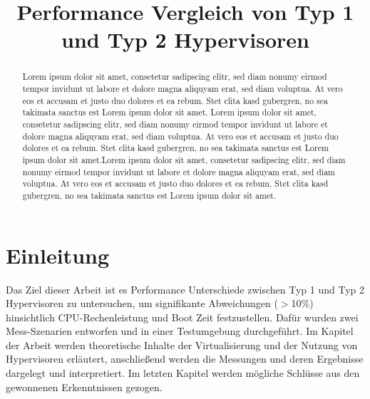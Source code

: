 \documentclass[conference]{IEEEtran}
\begin{document}
\title{Performance Vergleich von Typ 1 und Typ 2 Hypervisoren }

\author
{
}

\maketitle

\begin{abstract}
Lorem ipsum dolor sit amet, consetetur sadipscing elitr, sed diam nonumy eirmod tempor invidunt ut labore et dolore magna aliquyam erat, sed diam voluptua. At vero eos et accusam et justo duo dolores et ea rebum. Stet clita kasd gubergren, no sea takimata sanctus est Lorem ipsum dolor sit amet. Lorem ipsum dolor sit amet, consetetur sadipscing elitr, sed diam nonumy eirmod tempor invidunt ut labore et dolore magna aliquyam erat, sed diam voluptua. At vero eos et accusam et justo duo dolores et ea rebum. Stet clita kasd gubergren, no sea takimata sanctus est Lorem ipsum dolor sit amet.Lorem ipsum dolor sit amet, consetetur sadipscing elitr, sed diam nonumy eirmod tempor invidunt ut labore et dolore magna aliquyam erat, sed diam voluptua. At vero eos et accusam et justo duo dolores et ea rebum. Stet clita kasd gubergren, no sea takimata sanctus est Lorem ipsum dolor sit amet.
\end{abstract}

\IEEEpeerreviewmaketitle

\section{Einleitung}
\label{Einleitung}

Das Ziel dieser Arbeit ist es Performance Unterschiede zwischen Typ 1 und Typ 2 Hypervisoren zu untersuchen, um signifikante Abweichungen ($>$10\%) hinsichtlich CPU-Rechenleistung und Boot Zeit festzustellen. Dafür wurden zwei Mess-Szenarien entworfen und in einer Testumgebung durchgeführt. Im Kapitel der Arbeit werden theoretische Inhalte der Virtualisierung und der Nutzung von Hypervisoren erläutert, anschließend werden die Messungen und deren Ergebnisse dargelegt und interpretiert. Im letzten Kapitel werden mögliche Schlüsse aus den gewonnenen Erkenntnissen gezogen. 
\end{document}
